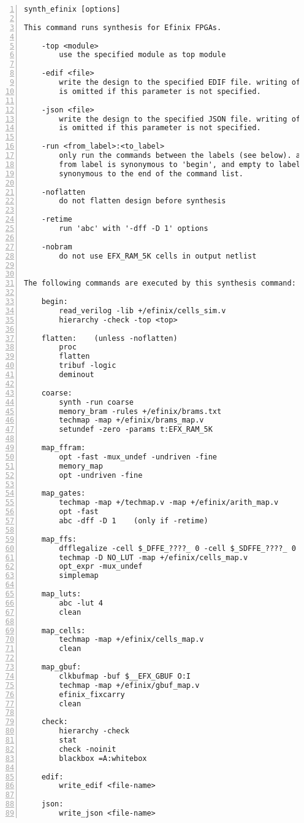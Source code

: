 \begin{lstlisting}[numbers=left,frame=single]
    synth_efinix [options]

This command runs synthesis for Efinix FPGAs.

    -top <module>
        use the specified module as top module

    -edif <file>
        write the design to the specified EDIF file. writing of an output file
        is omitted if this parameter is not specified.

    -json <file>
        write the design to the specified JSON file. writing of an output file
        is omitted if this parameter is not specified.

    -run <from_label>:<to_label>
        only run the commands between the labels (see below). an empty
        from label is synonymous to 'begin', and empty to label is
        synonymous to the end of the command list.

    -noflatten
        do not flatten design before synthesis

    -retime
        run 'abc' with '-dff -D 1' options

    -nobram
        do not use EFX_RAM_5K cells in output netlist


The following commands are executed by this synthesis command:

    begin:
        read_verilog -lib +/efinix/cells_sim.v
        hierarchy -check -top <top>

    flatten:    (unless -noflatten)
        proc
        flatten
        tribuf -logic
        deminout

    coarse:
        synth -run coarse
        memory_bram -rules +/efinix/brams.txt
        techmap -map +/efinix/brams_map.v
        setundef -zero -params t:EFX_RAM_5K

    map_ffram:
        opt -fast -mux_undef -undriven -fine
        memory_map
        opt -undriven -fine

    map_gates:
        techmap -map +/techmap.v -map +/efinix/arith_map.v
        opt -fast
        abc -dff -D 1    (only if -retime)

    map_ffs:
        dfflegalize -cell $_DFFE_????_ 0 -cell $_SDFFE_????_ 0 -cell $_SDFFCE_????_ 0 -cell $_DLATCH_?_ x
        techmap -D NO_LUT -map +/efinix/cells_map.v
        opt_expr -mux_undef
        simplemap

    map_luts:
        abc -lut 4
        clean

    map_cells:
        techmap -map +/efinix/cells_map.v
        clean

    map_gbuf:
        clkbufmap -buf $__EFX_GBUF O:I
        techmap -map +/efinix/gbuf_map.v
        efinix_fixcarry
        clean

    check:
        hierarchy -check
        stat
        check -noinit
        blackbox =A:whitebox

    edif:
        write_edif <file-name>

    json:
        write_json <file-name>
\end{lstlisting}

